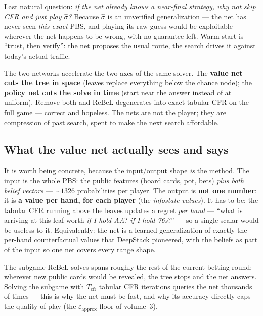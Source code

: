 \documentclass[11pt,a4paper]{article}
\begin{document}
Last natural question: \emph{if the net already knows a near-final strategy,
why not skip CFR and just play $\hat\sigma$?} Because $\hat\sigma$ is an
unverified generalization --- the net has never seen \emph{this exact} PBS,
and playing its raw guess would be exploitable wherever the net happens to
be wrong, with no guarantee left. Warm start is ``trust, then verify'': the
net proposes the usual route, the search drives it against today's actual
traffic.

\begin{intuition}
The two networks accelerate the two axes of the same solver. The
\textbf{value net cuts the tree in space} (leaves replace everything below
the chance node); the \textbf{policy net cuts the solve in time} (start near
the answer instead of at uniform). Remove both and ReBeL degenerates into
exact tabular CFR on the full game --- correct and hopeless. The nets are
not the player; they are compression of past search, spent to make the next
search affordable.
\end{intuition}

\subsection{What the value net actually sees and says}

It is worth being concrete, because the input/output shape \emph{is} the
method. The input is the whole PBS: the public features (board cards, pot,
bets) \emph{plus both belief vectors} --- ${\sim}1326$ probabilities per
player. The output is \textbf{not one number}: it is \textbf{a value per
hand, for each player} (the \emph{infostate values}). It has to be: the
tabular CFR running above the leaves updates a regret \emph{per hand} ---
``what is arriving at this leaf worth \emph{if I hold AA}? \emph{if I hold
76s}?'' --- so a single scalar would be useless to it. Equivalently: the net
is a learned generalization of exactly the per-hand counterfactual values
that DeepStack pioneered, with the beliefs as part of the input so one net
covers every range shape.

The subgame ReBeL solves spans roughly the rest of the current betting
round; wherever new public cards would be revealed, the tree stops and the
net answers. Solving the subgame with $T_{\mathrm{cfr}}$ tabular CFR
iterations queries the net thousands of times --- this is why the net must be
fast, and why its accuracy directly caps the quality of play (the
$\varepsilon_{\mathrm{approx}}$ floor of volume~3).
\end{document}
